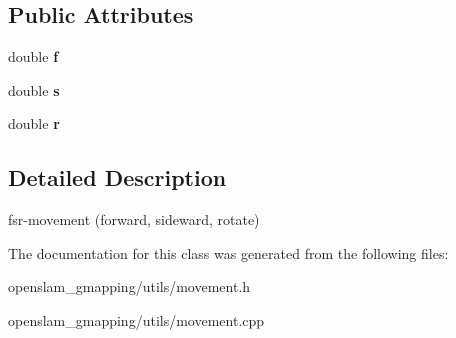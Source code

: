 \subsection*{Public Attributes}
\begin{DoxyCompactItemize}
\item 
\mbox{\label{classGMapping_1_1FSRMovement_a537404eea9e1b32f278bc29073c5aa0d}} 
double {\bfseries f}
\item 
\mbox{\label{classGMapping_1_1FSRMovement_a77978847222b856ae4fb685c6940b74c}} 
double {\bfseries s}
\item 
\mbox{\label{classGMapping_1_1FSRMovement_a97fa45f8404cb53068e3aa85baca6f01}} 
double {\bfseries r}
\end{DoxyCompactItemize}


\subsection{Detailed Description}
fsr-\/movement (forward, sideward, rotate) 

The documentation for this class was generated from the following files\+:\begin{DoxyCompactItemize}
\item 
openslam\+\_\+gmapping/utils/movement.\+h\item 
openslam\+\_\+gmapping/utils/movement.\+cpp\end{DoxyCompactItemize}
